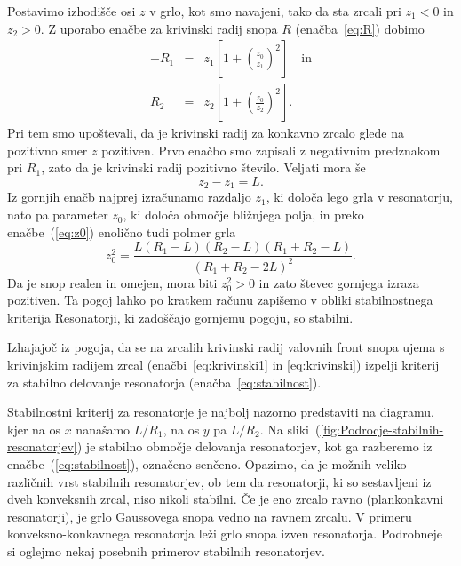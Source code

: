 Postavimo izhodišče osi $z$ v grlo, kot smo
navajeni, tako da sta zrcali pri $z_{1}<0$ in $z_{2}>0$. Z uporabo enačbe
za krivinski radij snopa $R$ (enačba~\ref{eq:R}) dobimo 
\begin{eqnarray}
-R_{1} & = & z_{1}\left[1+\left(\frac{z_{0}}{z_{1}}\right)^{2}\right] \quad  \label{eq:krivinski1} \textrm{in}\\
R_{2} & = & z_{2}\left[1+\left(\frac{z_{0}}{z_{2}}\right)^{2}\right].
\label{eq:krivinski}
\end{eqnarray}
Pri tem smo upoštevali, da je krivinski radij za konkavno zrcalo glede na pozitivno smer $z$ pozitiven.
Prvo enačbo smo zapisali z negativnim predznakom pri $R_1$, zato da je krivinski radij pozitivno število.
Veljati mora še 
\begin{equation}
z_{2}-z_{1}=L.
\label{eq:razlikaz}
\end{equation}
Iz gornjih enačb najprej izračunamo razdaljo $z_{1}$, ki določa
lego grla v resonatorju, nato pa parameter $z_{0}$, ki določa
območje bližnjega polja, in preko enačbe~(\ref{eq:z0}) enolično tudi polmer grla
\begin{equation}
z_{0}^{2}=\frac{L(R_{1}-L)(R_{2}-L)(R_{1}+R_{2}-L)}{(R_{1}+R_{2}-2L)^{2}}.
\label{eq:z0_stab}
\end{equation}
Da je snop realen in omejen, mora biti $z_{0}^{2}>0$ in zato števec
gornjega izraza pozitiven. Ta pogoj lahko po kratkem računu zapišemo
v obliki stabilnostnega kriterija
Resonatorji, ki zadoščajo gornjemu pogoju, so stabilni. 

\begin{definition}
Izhajajoč iz pogoja, da se na zrcalih krivinski radij valovnih front snopa ujema s krivinjskim
radijem zrcal (enačbi~\ref{eq:krivinski1} in \ref{eq:krivinski}) izpelji 
kriterij za stabilno delovanje resonatorja 
(enačba~\ref{eq:stabilnost}).
\end{definition}

Stabilnostni kriterij za resonatorje je najbolj nazorno predstaviti na diagramu, 
kjer na os $x$ nanašamo $L/R_{1}$, na os $y$ pa $L/R_{2}$. Na 
sliki~(\ref{fig:Podrocje-stabilnih-resonatorjev}) je stabilno območje delovanja 
resonatorjev, kot ga razberemo iz enačbe~(\ref{eq:stabilnost}), označeno senčeno.
Opazimo, da je možnih veliko različnih vrst stabilnih resonatorjev, ob tem da 
resonatorji, ki so sestavljeni iz dveh konveksnih zrcal, niso nikoli stabilni.
Če je eno zrcalo ravno (plankonkavni resonatorji), je grlo Gaussovega snopa vedno 
na ravnem zrcalu. V primeru konveksno-konkavnega resonatorja leži grlo snopa
izven resonatorja. Podrobneje si oglejmo nekaj posebnih primerov stabilnih resonatorjev. 


